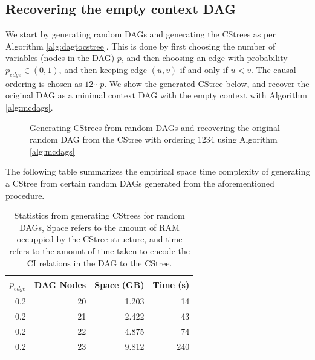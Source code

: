 \documentclass{tufte-book}
\begin{document}
\begin{Definition}
\section{Recovering the empty context DAG}
\label{sec:org691f7f4}
We start by generating random DAGs and generating the CStrees as per Algorithm \ref{alg:dagtocstree}. This is done by first choosing the number of variables (nodes in the DAG) \(p\), and then choosing an edge with probability \(p_{edge} \in (0,1)\), and then keeping edge \((u,v)\) if and only if \(u<v\). The causal ordering is chosen as \(12\cdots p\). We show the generated CStree below, and recover the original DAG as a minimal context DAG with the empty context with Algorithm \ref{alg:mcdags}. 

\begin{figure}[!h]\label{fig:dagtocstree_cstree}
   \begin{floatrow}
%
\caption{Generating CStrees from random DAGs and recovering the original random DAG from the CStree with ordering 1234 using Algorithm \ref{alg:mcdags}}
        
   \end{floatrow}
\end{figure}


The following table summarizes the empirical space time complexity of generating a CStree from certain random DAGs generated from the aforementioned procedure.

\begin{table}[htbp]
\caption{Statistics from generating CStrees for random DAGs, Space refers to the amount of RAM occuppied by the CStree structure, and time refers to the amount of time taken to encode the CI relations in the DAG to the CStree.}
\centering
\begin{tabular}{r|r|r|r}
\hline
\(p_{edge}\) & DAG Nodes & Space  (GB) & Time  (s)\\
\hline
0.2 & 20 & 1.203 & 14\\
0.2 & 21 & 2.422 & 43\\
0.2 & 22 & 4.875 & 74\\
0.2 & 23 & 9.812 & 240\\
\end{tabular}
\end{table}


\end{Definition}
\end{document}
